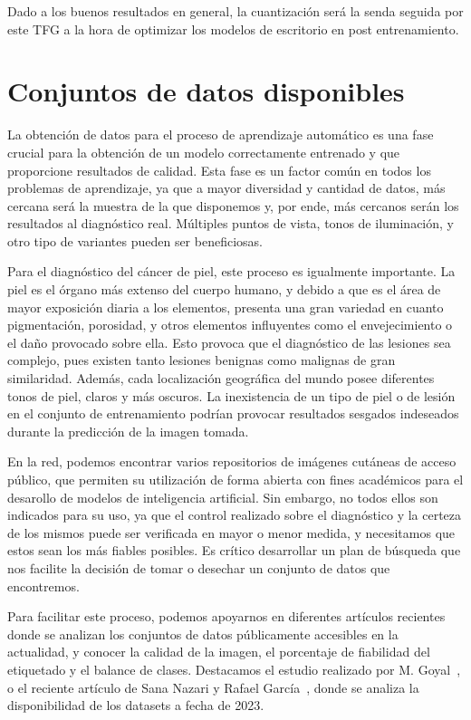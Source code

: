 Dado a los buenos resultados en general, la cuantización será la senda seguida por este TFG a la hora de optimizar los modelos de escritorio en post entrenamiento.


\newpage
\section{Conjuntos de datos disponibles}

La obtención de datos para el proceso de aprendizaje automático es una fase crucial para la obtención de un modelo correctamente entrenado y que proporcione resultados de calidad. Esta fase es un factor común en todos los problemas de aprendizaje, ya que a mayor diversidad y cantidad de datos, más cercana será la muestra de la que disponemos y, por ende, más cercanos serán los resultados al diagnóstico real. Múltiples puntos de vista, tonos de iluminación, y otro tipo de variantes pueden ser  beneficiosas.

Para el diagnóstico del cáncer de piel, este proceso es igualmente importante. La piel es el órgano más extenso del cuerpo humano, y debido a que es el área de mayor exposición diaria a los elementos, presenta una gran variedad en cuanto pigmentación, porosidad, y otros elementos influyentes como el envejecimiento o el daño provocado sobre ella. Esto provoca que el diagnóstico de las lesiones sea complejo, pues existen tanto lesiones benignas como malignas de gran similaridad. Además, cada localización geográfica del mundo posee diferentes tonos de piel, claros y más oscuros. La inexistencia de un tipo de piel o de lesión en el conjunto de entrenamiento podrían provocar resultados sesgados indeseados durante la predicción de la imagen tomada.

En la red, podemos encontrar varios repositorios de imágenes cutáneas de acceso público,  que permiten su utilización de forma abierta con fines académicos para el desarollo de modelos de inteligencia artificial. Sin embargo, no todos ellos son indicados para su uso, ya que el control realizado sobre el diagnóstico y la certeza de los mismos puede ser verificada en mayor o menor medida, y necesitamos que estos sean los más fiables posibles. Es crítico desarrollar un plan de búsqueda que nos facilite la decisión de tomar o desechar un conjunto de datos que encontremos.

Para facilitar este proceso, podemos apoyarnos en diferentes artículos recientes donde se analizan los conjuntos de datos públicamente accesibles en la actualidad, y conocer la calidad de la imagen, el porcentaje de fiabilidad del etiquetado y el balance de clases. Destacamos el estudio realizado por M. Goyal~\cite{goyal2020artificial}, o el reciente artículo de  Sana Nazari y Rafael García~\cite{life13112123}, donde se analiza la disponibilidad de los datasets a fecha de 2023.

